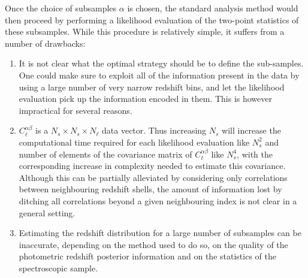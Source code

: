 \documentclass[a4paper,10pt]{article}
\begin{document}
  Once the choice of subsamples $\alpha$ is chosen, the standard analysis method would then proceed by performing a likelihood evaluation of the two-point statistics of these subsamples. While this procedure is relatively simple, it suffers from a number of drawbacks:
  \begin{enumerate}
   \item It is not clear what the optimal strategy should be to define the sub-samples. One could make sure to exploit all of the information present in the data by using a large number of very narrow redshift bins, and let the likelihood evaluation pick up the information encoded in them. This is however impractical for several reasons.
   \item $C^{\alpha\beta}_\ell$ is a $N_s\times N_s\times N_\ell$ data vector. Thus increasing $N_s$ will increase the computational time required for each likelihood evaluation like $N_s^2$ and number of elements of the covariance matrix of $C^{\alpha\beta}_\ell$ like $N_s^4$, with the corresponding increase in complexity needed to estimate this covariance. Although this can be partially alleviated by considering only correlations between neighbouring redshift shells, the amount of information lost by ditching all correlations beyond a given neighbouring index is not clear in a general setting.
   \item Estimating the redshift distribution for a large number of subsamples can be inaccurate, depending on the method used to do so, on the quality of the photometric redshift posterior information and on the statistics of the spectroscopic sample.
  \end{enumerate}
  
\end{document}

